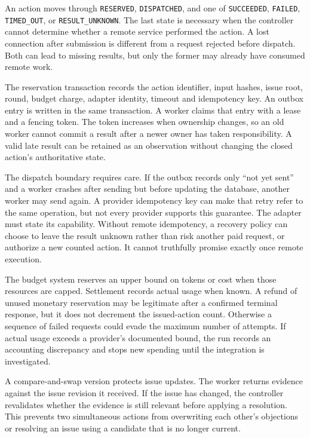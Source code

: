 \documentclass[12pt,a4paper,oneside,openany]{book}
\begin{document}
An action moves through \texttt{RESERVED}, \texttt{DISPATCHED}, and one of
\texttt{SUCCEEDED}, \texttt{FAILED}, \texttt{TIMED\_OUT}, or
\texttt{RESULT\_UNKNOWN}. The last state is necessary when the controller cannot
determine whether a remote service performed the action. A lost connection after
submission is different from a request rejected before dispatch. Both can lead
to missing results, but only the former may already have consumed remote work.

The reservation transaction records the action identifier, input hashes, issue
root, round, budget charge, adapter identity, timeout and idempotency key. An
outbox entry is written in the same transaction. A worker claims that entry with
a lease and a fencing token. The token increases when ownership changes, so an
old worker cannot commit a result after a newer owner has taken responsibility.
A valid late result can be retained as an observation without changing the closed
action's authoritative state.

The dispatch boundary requires care. If the outbox records only ``not yet sent''
and a worker crashes after sending but before updating the database, another
worker may send again. A provider idempotency key can make that retry refer to the
same operation, but not every provider supports this guarantee. The adapter must
state its capability. Without remote idempotency, a recovery policy can choose to
leave the result unknown rather than risk another paid request, or authorize a
new counted action. It cannot truthfully promise exactly once remote execution.

The budget system reserves an upper bound on tokens or cost when those resources
are capped. Settlement records actual usage when known. A refund of unused
monetary reservation may be legitimate after a confirmed terminal response, but
it does not decrement the issued-action count. Otherwise a sequence of failed
requests could evade the maximum number of attempts. If actual usage exceeds a
provider's documented bound, the run records an accounting discrepancy and stops
new spending until the integration is investigated.

A compare-and-swap version protects issue updates. The worker returns evidence
against the issue revision it received. If the issue has changed, the controller
revalidates whether the evidence is still relevant before applying a resolution.
This prevents two simultaneous actions from overwriting each other's objections
or resolving an issue using a candidate that is no longer current.
\end{document}
